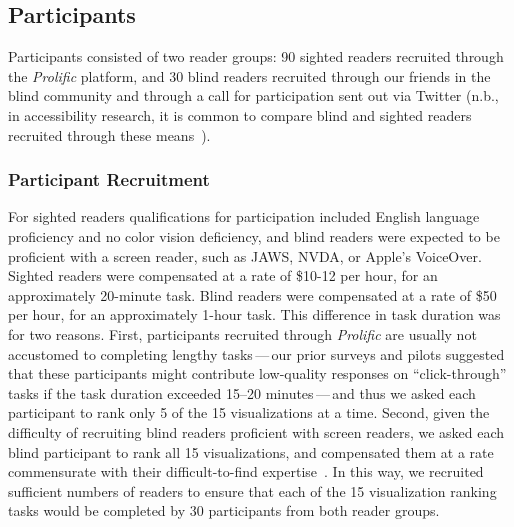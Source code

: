 \subsection{Participants}

Participants consisted of two reader groups: {90} sighted readers recruited through the \emph{Prolific} platform, and {30} blind readers recruited through our friends in the blind community and through a call for participation sent out via Twitter (n.b., in accessibility research, it is common to compare blind and sighted readers recruited through these means~\cite{bigham_effects_2017}).

\subsubsection{Participant Recruitment}

For sighted readers qualifications for participation included English language proficiency and no color vision deficiency, and blind readers were expected to be proficient with a screen reader, such as \ac{JAWS}, \ac{NVDA}, or Apple's VoiceOver.
Sighted readers were compensated at a rate of \$10-12 per hour, for an approximately 20-minute task. 
Blind readers were compensated at a rate of \$50 per hour, for an approximately 1-hour task. 
This difference in task duration was for two reasons. 
First, participants recruited through \emph{Prolific} are usually not accustomed to completing lengthy tasks\,---\,our prior surveys and pilots suggested that these participants might contribute low-quality responses on ``click-through'' tasks if the task duration exceeded 15--20 minutes\,---\,and thus we asked each participant to rank only 5 of the 15 visualizations at a time.
Second, given the difficulty of recruiting blind readers proficient with screen readers, we asked each blind participant to rank all 15 visualizations, and compensated them at a rate commensurate with their difficult-to-find expertise~\cite{lundgard_sociotechnical_2019}.
In this way, we recruited sufficient numbers of readers to ensure that each of the 15 visualization ranking tasks would be completed by 30 participants from both reader groups.

